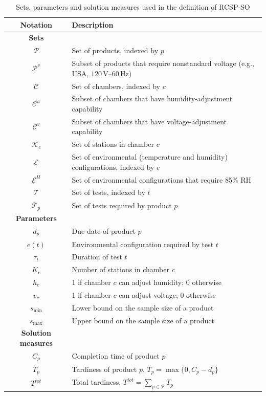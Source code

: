 \documentclass[11pt]{article}
\begin{document}
\begin{table}[H]
\caption{Sets, parameters and solution measures used in the definition of RCSP-SO}
\label{tab:notation_RCSP-SO}
\label{tab:notation_tcssop}
\centering
\small
\begin{tabular}{cl}
\toprule
\textbf{Notation} & \textbf{Description}\\
\midrule
\textbf{Sets} & \\
\midrule
\(\mathcal{P}\) & Set of products, indexed by \(p\) \\
\(\mathcal{P}^v\) & Subset of products that require nonstandard voltage (e.g., USA, \(120\,\mathrm{V}\)--\(60\,\mathrm{Hz}\)) \\
\(\mathcal{C}\) & Set of chambers, indexed by \(c\) \\
\(\mathcal{C}^h\) & Subset of chambers that have humidity-adjustment capability \\
\(\mathcal{C}^v\) & Subset of chambers that have voltage-adjustment capability \\
\(\mathcal{K}_c\) & Set of stations in chamber \(c\) \\
\(\mathcal{E}\) & Set of environmental (temperature and humidity) configurations, indexed by \(e\) \\
\(\mathcal{E}^H\) & Set of environmental configurations that require 85\% RH \\
\(\mathcal{T}\) & Set of tests, indexed by \(t\) \\
\(\mathcal{T}_p\) & Set of tests required by product \(p\) \\
\midrule
\textbf{Parameters} & \\
\midrule
\(d_p\) & Due date of product \(p\) \\
\(e(t)\) & Environmental configuration required by test \(t\) \\
\(\tau_t\) & Duration of test \(t\) \\
\(K_c\) & Number of stations in chamber \(c\) \\
\(h_c\) & 1 if chamber \(c\) can adjust humidity; 0 otherwise \\
\(v_c\) & 1 if chamber \(c\) can adjust voltage; 0 otherwise \\
\(s_{\min}\) & Lower bound on the sample size of a product \\
\(s_{\max}\) & Upper bound on the sample size of a product \\
\midrule
\textbf{Solution measures} & \\
\midrule
\(C_p\) & Completion time of product \(p\) \\
\(T_p\) & Tardiness of product \(p\), \(T_p=\max\{0,C_p-d_p\}\) \\
\(T^{tot}\) & Total tardiness, \(T^{tot}=\sum_{p\in\mathcal{P}}T_p\) \\
\bottomrule
\end{tabular}
\end{table}
\end{document}
